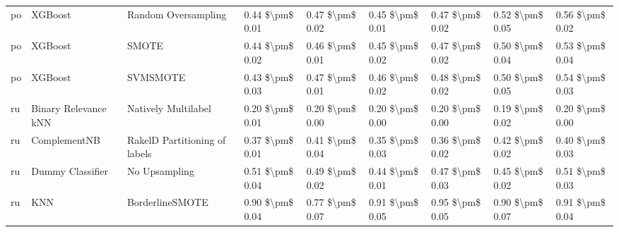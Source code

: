 \begin{tabular}{lllllllll}
      po &                         XGBoost &           Random Oversampling &     0.44 \$\textbackslash pm\$ 0.01 &           0.47 \$\textbackslash pm\$ 0.02 &       0.45 \$\textbackslash pm\$ 0.01 &        0.47 \$\textbackslash pm\$ 0.02 &                         0.52 \$\textbackslash pm\$ 0.05 &     0.56 \$\textbackslash pm\$ 0.02 \\
      po &                         XGBoost &                         SMOTE &     0.44 \$\textbackslash pm\$ 0.02 &           0.46 \$\textbackslash pm\$ 0.01 &       0.45 \$\textbackslash pm\$ 0.02 &        0.47 \$\textbackslash pm\$ 0.02 &                         0.50 \$\textbackslash pm\$ 0.04 &     0.53 \$\textbackslash pm\$ 0.04 \\
      po &                         XGBoost &                      SVMSMOTE &     0.43 \$\textbackslash pm\$ 0.03 &           0.47 \$\textbackslash pm\$ 0.01 &       0.46 \$\textbackslash pm\$ 0.02 &        0.48 \$\textbackslash pm\$ 0.02 &                         0.50 \$\textbackslash pm\$ 0.05 &     0.54 \$\textbackslash pm\$ 0.03 \\
      ru &            Binary Relevance kNN &           Natively Multilabel &     0.20 \$\textbackslash pm\$ 0.01 &           0.20 \$\textbackslash pm\$ 0.00 &       0.20 \$\textbackslash pm\$ 0.00 &        0.20 \$\textbackslash pm\$ 0.00 &                         0.19 \$\textbackslash pm\$ 0.02 &     0.20 \$\textbackslash pm\$ 0.00 \\
      ru &                    ComplementNB & RakelD Partitioning of labels &     0.37 \$\textbackslash pm\$ 0.01 &           0.41 \$\textbackslash pm\$ 0.04 &       0.35 \$\textbackslash pm\$ 0.03 &        0.36 \$\textbackslash pm\$ 0.02 &                         0.42 \$\textbackslash pm\$ 0.02 &     0.40 \$\textbackslash pm\$ 0.03 \\
      ru &                Dummy Classifier &                 No Upsampling &     0.51 \$\textbackslash pm\$ 0.04 &           0.49 \$\textbackslash pm\$ 0.02 &       0.44 \$\textbackslash pm\$ 0.01 &        0.47 \$\textbackslash pm\$ 0.03 &                         0.45 \$\textbackslash pm\$ 0.02 &     0.51 \$\textbackslash pm\$ 0.03 \\
      ru &                             KNN &               BorderlineSMOTE &     0.90 \$\textbackslash pm\$ 0.04 &           0.77 \$\textbackslash pm\$ 0.07 &       0.91 \$\textbackslash pm\$ 0.05 &        0.95 \$\textbackslash pm\$ 0.05 &                         0.90 \$\textbackslash pm\$ 0.07 &     0.91 \$\textbackslash pm\$ 0.04 \\

\end{tabular}

